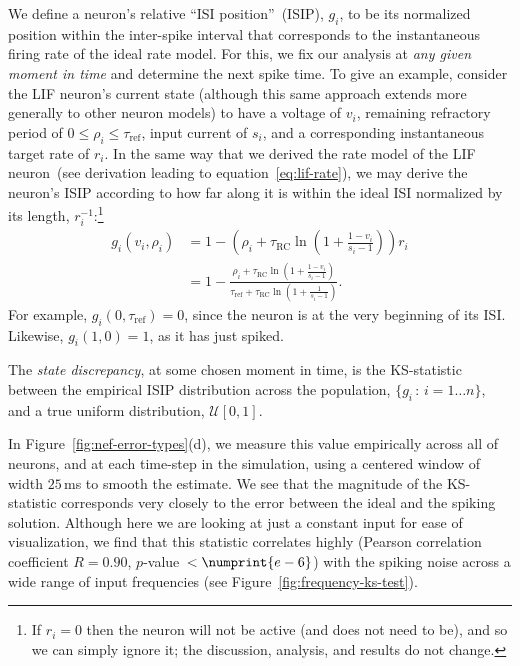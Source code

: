 We define a neuron's relative ``ISI position''~(ISIP), $g_i$, to be its normalized position within the inter-spike interval that corresponds to the instantaneous firing rate of the ideal rate model.
For this, we fix our analysis at \emph{any given moment in time} and determine the next spike time.
To give an example, consider the LIF neuron's current state (although this same approach extends more generally to other neuron models) to have a voltage of $v_i$, remaining refractory period of $0 \le \rho_i \le \tau_\text{ref}$, input current of $s_i$, and a corresponding instantaneous target rate of $r_i$.
In the same way that we derived the rate model of the LIF neuron~(see derivation leading to equation~\ref{eq:lif-rate}), we may derive the neuron's ISIP according to how far along it is within the ideal ISI normalized by its length, $r_i^{-1}$:\footnote{%
If $r_i = 0$ then the neuron will not be active (and does not need to be), and so we can simply ignore it; the discussion, analysis, and results do not change.}
\begin{equation} \label{eq:lif-isip}
\begin{aligned}
g_i(v_i, \rho_i) &= 1 - \left( \rho_i + \tau_\text{RC} \ln \left( 1 + \frac{1 - v_i}{s_i - 1} \right) \right) r_i \\
&= 1 - \frac{\rho_i + \tau_\text{RC} \ln \left( 1 + \frac{1 - v_i}{s_i - 1} \right)}{\tau_\text{ref} + \tau_\text{RC} \ln \left( 1 + \frac{1}{s_i - 1} \right)} \text{.}
\end{aligned}
\end{equation}
For example, $g_i(0, \tau_\text{ref}) = 0$, since the neuron is at the very beginning of its ISI.
Likewise, $g_i(1, 0) = 1$, as it has just spiked.

\begin{definition} \label{def:state-discrepancy}
The \emph{state discrepancy}, at some chosen moment in time, is the KS-statistic between the empirical ISIP distribution across the population, $\{g_i \, : \, i = 1 \ldots n\}$, and a true uniform distribution, $\mathcal{U}[0, 1]$.
\end{definition}

In Figure~\ref{fig:nef-error-types}(d), we measure this value empirically across all of neurons, and at each time-step in the simulation, using a centered window of width $25$\,ms to smooth the estimate.
We see that the magnitude of the KS-statistic corresponds very closely to the error between the ideal and the spiking solution.
Although here we are looking at just a constant input for ease of visualization, we find that this statistic correlates highly (Pearson correlation coefficient $R = 0.90$, $p$-value~$< \numprint{e-6}$) with the spiking noise across a wide range of input frequencies (see Figure~\ref{fig:frequency-ks-test}).

